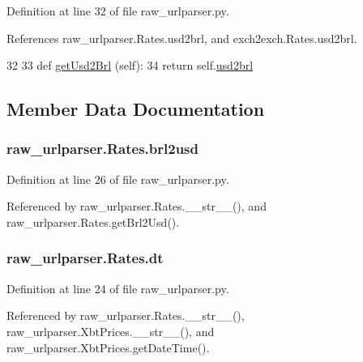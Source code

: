 Definition at line 32 of file raw\-\_\-urlparser.\-py.



References raw\-\_\-urlparser.\-Rates.\-usd2brl, and exch2exch.\-Rates.\-usd2brl.


\begin{DoxyCode}
32 
33     \textcolor{keyword}{def }\hyperlink{classraw__urlparser_1_1_rates_aaf3f32369f17da5fc903a7a51feca25f}{getUsd2Brl} (self):
34         \textcolor{keywordflow}{return} self.\hyperlink{classraw__urlparser_1_1_rates_a52d9b688be8385a87783b27839749b4a}{usd2brl}
    
\end{DoxyCode}


\subsection{Member Data Documentation}
\hypertarget{classraw__urlparser_1_1_rates_adc9df007bec75344f9f89cb631d1aeb3}{
\subsubsection[{brl2usd}]{\setlength{\rightskip}{0pt plus 5cm}raw\-\_\-urlparser.\-Rates.\-brl2usd}}\label{classraw__urlparser_1_1_rates_adc9df007bec75344f9f89cb631d1aeb3}


Definition at line 26 of file raw\-\_\-urlparser.\-py.



Referenced by raw\-\_\-urlparser.\-Rates.\-\_\-\-\_\-str\-\_\-\-\_\-(), and raw\-\_\-urlparser.\-Rates.\-get\-Brl2\-Usd().

\hypertarget{classraw__urlparser_1_1_rates_a09b3c7cb595f3135c3eda648b1bb4c3f}{
\subsubsection[{dt}]{\setlength{\rightskip}{0pt plus 5cm}raw\-\_\-urlparser.\-Rates.\-dt}}\label{classraw__urlparser_1_1_rates_a09b3c7cb595f3135c3eda648b1bb4c3f}


Definition at line 24 of file raw\-\_\-urlparser.\-py.



Referenced by raw\-\_\-urlparser.\-Rates.\-\_\-\-\_\-str\-\_\-\-\_\-(), raw\-\_\-urlparser.\-Xbt\-Prices.\-\_\-\-\_\-str\-\_\-\-\_\-(), and raw\-\_\-urlparser.\-Xbt\-Prices.\-get\-Date\-Time().

